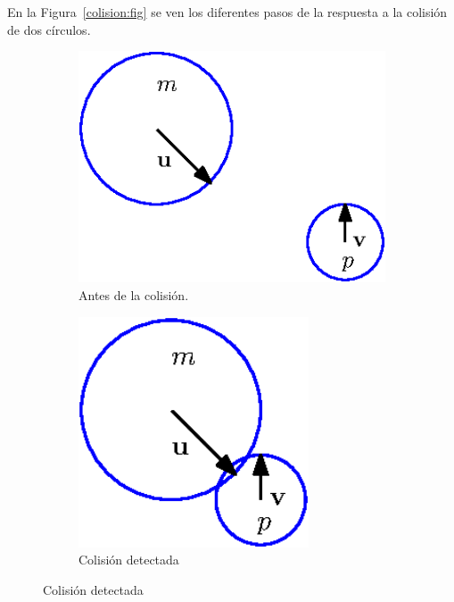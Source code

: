 En la Figura~\ref{colision:fig} se ven los diferentes pasos de la respuesta a la colisión de dos círculos.
\begin{figure}
 \centering
  \begin{subfigure}[b]{0.32\textwidth}
    \includegraphics[width=1.2\textwidth]{Img/02/colisionesAntes}
    \caption{Antes de la colisión.}
    \label{fig:coliAntes}
  \end{subfigure}
  \hspace{2cm}
  \begin{subfigure}[b]{0.32\textwidth}
    \includegraphics[width=0.75\textwidth]{Img/02/colisionesDetecta}
    \caption{Colisión detectada}
    \label{fig:coliDetecta}
  \end{subfigure}

\end{figure}
